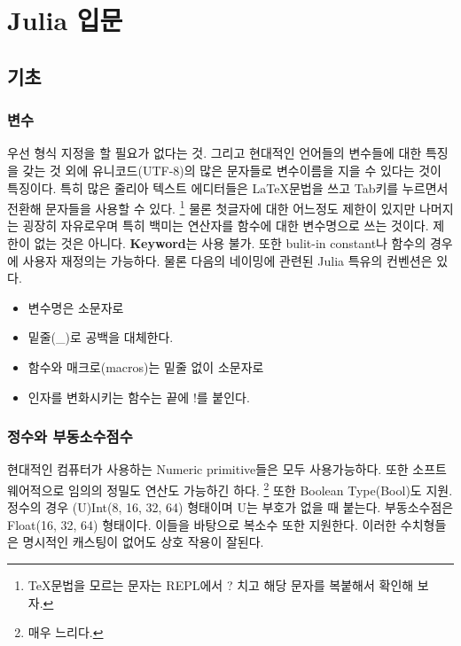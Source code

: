 \documentclass[a4paper, 11pt]{report}
\theoremstyle{definition}
\begin{document}
\appendix


\chapter{Julia  입문}

\section{기초}

\subsection{변수}

우선 형식 지정을 할 필요가 없다는 것. 그리고 현대적인 언어들의 변수들에 대한 특징을 갖는 것 외에
유니코드(UTF-8)의 많은 문자들로 변수이름을 지을 수 있다는 것이 특징이다. 
특히 많은 줄리아 텍스트 에디터들은 \LaTeX 문법을 쓰고 Tab키를 누르면서 전환해 문자들을 사용할 수 있다.
\footnote{\TeX 문법을 모르는 문자는 REPL에서 ? 치고 해당 문자를 복붙해서 확인해 보자.}
물론 첫글자에 대한 어느정도 제한이 있지만 나머지는 굉장히 자유로우며 특히 백미는 연산자를 함수에 대한 변수명으로 쓰는 것이다.
제한이 없는 것은 아니다. \textbf{Keyword}는 사용 불가. 또한 bulit-in constant나 함수의 경우 에 사용자 재정의는 가능하다.
물론 다음의 네이밍에 관련된 Julia 특유의 컨벤션은 있다.
\begin{itemize}
    \item 변수명은 소문자로
    \item 밑줄(\_)로 공백을 대체한다.
    \item 함수와 매크로(macros)는 밑줄 없이 소문자로
    \item 인자를 변화시키는 함수는 끝에 !를 붙인다.
\end{itemize}

\subsection{정수와 부동소수점수}
현대적인 컴퓨터가 사용하는 Numeric primitive들은 모두 사용가능하다. 또한 소프트웨어적으로 임의의 정밀도 연산도 가능하긴 하다.
\footnote{매우 느리다.}
또한 Boolean Type(Bool)도 지원. 정수의 경우  (U)Int(8, 16, 32, 64) 형태이며 U는 부호가 없을 때 붙는다. 부동소수점은 Float(16, 32, 64) 형태이다. 이들을 바탕으로 복소수 또한 지원한다. 이러한 수치형들은 명시적인 캐스팅이 없어도 상호 작용이
잘된다.
\end{document}
